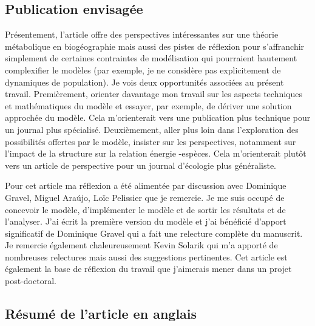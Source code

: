 \subsection{Publication envisagée}

Présentement, l'article offre des perspectives intéressantes sur une
théorie métabolique en biogéographie mais aussi des pistes de réflexion
 pour s'affranchir simplement de certaines contraintes de modélisation
qui pourraient hautement  complexifier le modèles (par exemple,  je ne considère
pas explicitement de dynamiques de population). Je vois deux opportunités
associées au présent travail. Premièrement, orienter davantage mon travail
sur les aspects techniques et mathématiques du modèle et essayer,
par exemple, de dériver une solution approchée du modèle.
Cela m'orienterait vers une publication plus technique
pour un journal plus spécialisé. Deuxièmement, aller plus loin dans l'exploration
des possibilités offertes par le modèle, insister sur les perspectives, notamment
sur l'impact de la structure sur la relation énergie -espèces. Cela m'orienterait plutôt vers
un article de perspective pour un journal d’écologie plus généraliste.


Pour cet article ma réflexion a été alimentée par discussion avec Dominique Gravel,
Miguel Araújo, Loïc Pelissier que je remercie. Je me suis occupé de concevoir le modèle,
d'implémenter le modèle et de sortir les résultats et de l'analyser.
J'ai écrit la première version du modèle et j'ai bénéficié d'apport significatif
de Dominique Gravel qui a fait une relecture complète du manuscrit. Je remercie
également chaleureusement Kevin Solarik qui m'a apporté de nombreuses
relectures mais aussi des suggestions pertinentes.
Cet article est également la base de réflexion du travail que
j’aimerais mener dans un projet post-doctoral.


\subsection{Résumé de l'article en anglais}

